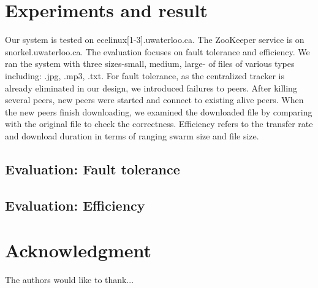 \documentclass[conference]{IEEEtran}
\begin{document}
	\section{Experiments and result}
	Our system is tested on ecelinux[1-3].uwaterloo.ca. The ZooKeeper service is on snorkel.uwaterloo.ca. The evaluation focuses on fault tolerance and efficiency. We ran the system with three sizes-small, medium, large- of files of various types including: .jpg, .mp3, .txt.
	For fault tolerance, as the centralized tracker is already eliminated in our design, we introduced failures to peers. After killing several peers, new peers were started and connect to existing alive  peers. When the new peers finish downloading, we examined the downloaded file by comparing with the original file to check the correctness. Efficiency refers to the transfer rate and download duration in terms of ranging swarm size and file size.
	
	\subsection{Evaluation: Fault tolerance}
	
	\subsection{Evaluation: Efficiency}
	
	
	
	\section*{Acknowledgment}
	
	
	The authors would like to thank...
	
	
	
	
	
	
	
\end{document}

